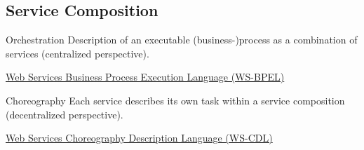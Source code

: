 \subsection{Service Composition}
\begin{frame}{\myframetitle}
	\begin{fancycolumns}[t]
		\begin{definition}{Orchestration }
			Description of an executable (business-)process as a combination of services (centralized perspective).
		\end{definition}
		\begin{example}{}
			\href{https://docs.oasis-open.org/wsbpel/2.0/wsbpel-v2.0.html}{Web Services Business Process Execution Language (WS-BPEL)}
		\end{example}

		\centering{}
	\nextcolumn
		\begin{definition}{Choreography }
			Each service describes its own task within a service composition (decentralized perspective).
		\end{definition}
		\begin{example}{}
			\href{https://www.w3.org/TR/ws-cdl-10/}{Web Services Choreography Description Language (WS-CDL)}
		\end{example}

		\centering{}
	\end{fancycolumns}	
\end{frame}